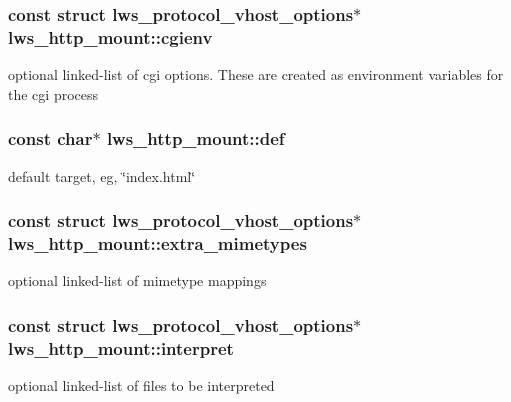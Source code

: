 \subsubsection[{\texorpdfstring{cgienv}{cgienv}}]{\setlength{\rightskip}{0pt plus 5cm}const struct {\bf lws\+\_\+protocol\+\_\+vhost\+\_\+options}$\ast$ lws\+\_\+http\+\_\+mount\+::cgienv}\hypertarget{structlws__http__mount_ae7b5c0f4c5408061e6ea3a8d281f45af}{}\label{structlws__http__mount_ae7b5c0f4c5408061e6ea3a8d281f45af}
optional linked-\/list of cgi options. These are created as environment variables for the cgi process 
\subsubsection[{\texorpdfstring{def}{def}}]{\setlength{\rightskip}{0pt plus 5cm}const char$\ast$ lws\+\_\+http\+\_\+mount\+::def}\hypertarget{structlws__http__mount_ae90d1efe7178199fad39de2926902ee4}{}\label{structlws__http__mount_ae90d1efe7178199fad39de2926902ee4}
default target, eg, \char`\"{}index.\+html\char`\"{} 
\subsubsection[{\texorpdfstring{extra\+\_\+mimetypes}{extra\_mimetypes}}]{\setlength{\rightskip}{0pt plus 5cm}const struct {\bf lws\+\_\+protocol\+\_\+vhost\+\_\+options}$\ast$ lws\+\_\+http\+\_\+mount\+::extra\+\_\+mimetypes}\hypertarget{structlws__http__mount_a4437423df85ee3dbcae0e15974c89ec7}{}\label{structlws__http__mount_a4437423df85ee3dbcae0e15974c89ec7}
optional linked-\/list of mimetype mappings 
\subsubsection[{\texorpdfstring{interpret}{interpret}}]{\setlength{\rightskip}{0pt plus 5cm}const struct {\bf lws\+\_\+protocol\+\_\+vhost\+\_\+options}$\ast$ lws\+\_\+http\+\_\+mount\+::interpret}\hypertarget{structlws__http__mount_a11ea62b952710d59733dbcf9794a5773}{}\label{structlws__http__mount_a11ea62b952710d59733dbcf9794a5773}
optional linked-\/list of files to be interpreted 
